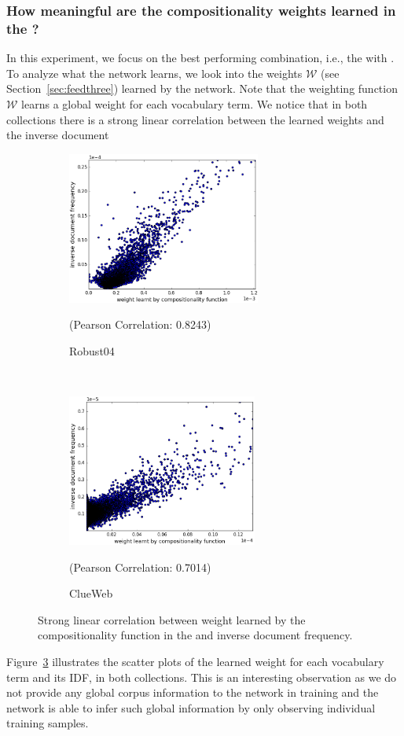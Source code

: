 \subsubsection{How meaningful are the compositionality weights learned in the \feedthree?}
%
In this experiment, we focus on the best performing combination, i.e., the \modelthree with \feedthrees. To analyze what the network learns, we look into the weights $\mathcal{W}$ (see Section~\ref{sec:feedthree}) learned by the network. Note that the weighting function $\mathcal{W}$ learns a global weight for each vocabulary term. We notice that in both collections there is a strong linear correlation between the learned weights and the inverse document
%
\begin{figure}[!t]%
    \centering
    \begin{subfigure}[t]{0.45\textwidth}
        \centering
        \includegraphics[height=5cm]{03-part-02/chapter-04/figs_and_tables/plot_composionality_idf_scatter_robust.png}
        \caption{\label{fig:scatter_r}Robust04}{\scriptsize{(Pearson Correlation: 0.8243)}}
    \end{subfigure}%
    ~
    \begin{subfigure}[t]{0.45\textwidth}
        \centering
        \includegraphics[height=5cm]{03-part-02/chapter-04/figs_and_tables/plot_composionality_idf_scatter_clueweb.png}
        \caption{\label{fig:scatter_c}ClueWeb}{\scriptsize{(Pearson Correlation: 0.7014)}}
    \end{subfigure}%
    \caption{\label{fig:scatter}Strong linear correlation between weight learned by the compositionality function in the \feedthree and inverse document frequency.}
\end{figure}
%
Figure~\ref{fig:scatter} illustrates the scatter plots of the learned weight for each vocabulary term and its IDF, in both collections.
This is an interesting observation as we do not provide any global corpus information to the network in training and the network is able to infer such global information by only observing individual training samples.

